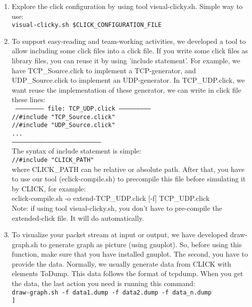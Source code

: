 \documentclass[a4paper]{article}
\begin{document}
\begin{enumerate}
        \item
        Explore the click configuration by using tool visual-clicky.sh. Simple way to use: \\    
    \texttt{visual-clicky.sh \$CLICK\_CONFIGURATION\_FILE}
        \item
        To support easy-reading and team-working activities, we developed a tool to allow including some click files into a click file. If you write some click files as library files, you can reuse it by using 'include statement'. For example, we have TCP\_Source.click to implement a TCP-generator, and UDP\_Source.click to implement an UDP-generator. In TCP\_UDP.click, we want reuse the implementation of these generator, we can write in click file these lines: \\
        \texttt{
  ------------------------ file: TCP\_UDP.click ---------------------------\\
  //#include "TCP\_Source.click"\\
  //#include "UDP\_Source.click"\\
  ...\\
  --------------------------------------------------------------------------}\\
  The syntax of include statement is simple:\\
          \texttt{//#include "CLICK\_PATH"}\\
  where CLICK\_PATH can be relative or absolute path. After that, you have to use our tool (eclick-compile.sh) to precompile this file before simulating it by CLICK, for example:\\
    eclick-compile.sh -o extend-TCP\_UDP.click [-f] TCP\_UDP.click\\
Note: if using tool visual-clicky.sh, you don't have to pre-compile the extended-click file. It will do automatically.
        \item
        \begin{flushleft}
        To visualize your packet stream at input or output, we have developed draw-graph.sh to generate graph as picture (using gnuplot). So, before using this function, make sure that you have installed gnuplot. The second, you have to provide the data. Normally, we usually generate data from CLICK with elements ToDump. This data follows the format of tcpdump. When you get the data, the last action you need is running this command:\\
\texttt{draw-graph.sh -f data1.dump -f data2.dump -f data\_n.dump \\
      [[-o PNG\_FILES]]\\
}
\end{flushleft}
\end{enumerate}
\end{document}
